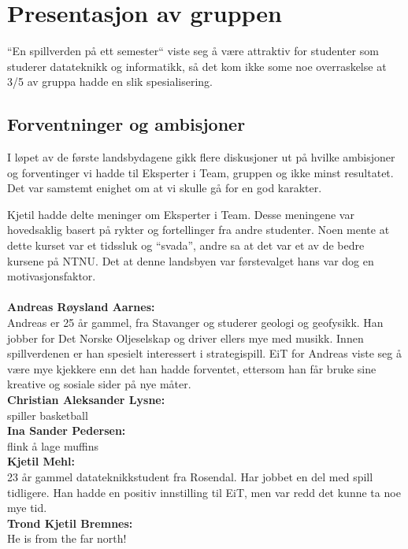 \section{Presentasjon av gruppen}
``En spillverden på ett semester`` viste seg å være attraktiv for
studenter som studerer datateknikk og informatikk, så det kom ikke some
noe overraskelse at 3/5 av gruppa hadde en slik spesialisering.

\subsection{Forventninger og ambisjoner}
I løpet av de første landsbydagene gikk flere diskusjoner ut på hvilke
ambisjoner og forventinger vi hadde til Eksperter i Team, gruppen og
ikke minst resultatet. Det var samstemt enighet om at vi skulle gå for
en god karakter.

Kjetil hadde delte meninger om Eksperter i Team. Desse meningene var
hovedsaklig basert på rykter og fortellinger fra andre studenter. Noen
mente at dette kurset var et tidssluk og ``svada'', andre sa at det var
et av de bedre kursene på NTNU. Det at denne landsbyen var førstevalget
hans var dog en motivasjonsfaktor.
\\
\\
\textbf{Andreas Røysland Aarnes:}\\
Andreas er 25 år gammel, fra Stavanger og studerer geologi og geofysikk. Han jobber for Det Norske Oljeselskap og driver ellers mye med musikk. Innen spillverdenen er han spesielt interessert i strategispill. EiT for Andreas viste seg å være mye kjekkere enn det han hadde forventet, ettersom han får bruke sine kreative og sosiale sider på nye måter. \\
\textbf{Christian Aleksander Lysne:}\\
spiller basketball \\
\textbf{Ina Sander Pedersen:}\\
flink å lage muffins \\
\textbf{Kjetil Mehl:}\\
23 år gammel datateknikkstudent fra Rosendal. Har jobbet en del med
spill tidligere. Han hadde en positiv innstilling til EiT, men var
redd det kunne ta noe mye tid.\\
\textbf{Trond Kjetil Bremnes:}\\
He is from the far north! \\

